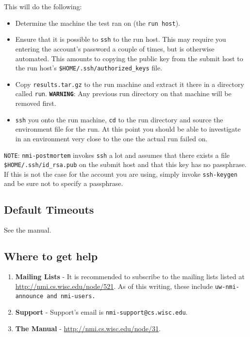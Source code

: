 This will do the following:
\begin{itemize}

	\item Determine the machine the test ran on (the {\tt run host}).

	\item Ensure that it is possible to {\tt ssh} to the run host.  This may
	require you entering the account's password a couple of times, but is
	otherwise automated.  This amounts to copying the public key from the submit
    host to the run host's {\tt \$HOME/.ssh/authorized\_keys} file.

	\item Copy {\tt results.tar.gz} to the run machine and extract it there in a
	directory called {\tt run}.  {\bf {\tt WARNING}}: Any previous run directory on
	that machine will be removed first.

	\item {\tt ssh} you onto the run machine, {\tt cd} to the run directory and
	source the environment file for the run.  At this point you should be able
	to investigate in an environment very close to the one the actual run failed
	on.
\end{itemize}

{\tt NOTE}: {\tt nmi-postmortem} invokes {\tt ssh} a lot and assumes that there
exists a file {\tt \$HOME/.ssh/id\_rsa.pub} on the submit host and that this key
has no passphrase.  If this is not the case for the account you are using,
simply invoke {\tt ssh-keygen} and be sure not to specify a passphrase.


\subsection{Default Timeouts}
   See the manual.


\subsection{Where to get help}

\begin{enumerate}
	\item {\bf Mailing Lists} - It is recommended to subscribe to the mailing
		lists listed at \url{http://nmi.cs.wisc.edu/node/521}.  As of this writing,
		these include \tt{uw-nmi-announce} and \tt{nmi-users}.

	\item {\bf Support} - Support's email is {\tt nmi-support@cs.wisc.edu}.

    \item {\bf The Manual} - \url{http://nmi.cs.wisc.edu/node/31}.
\end{enumerate}



